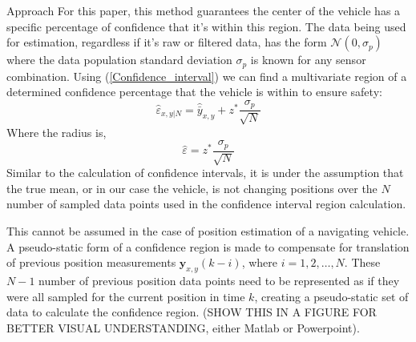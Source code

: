 \begin{section}{Approach}
For this paper, this method guarantees the center of the vehicle has a specific percentage of confidence that it's within this region. The data being used for estimation, regardless if it's raw or filtered data, has the form $\mathcal{N}(0,\sigma_p)$ where the data population standard deviation $\sigma_p$ is known for any sensor combination. Using (\ref{Confidence_interval}) we can find a multivariate region of a determined confidence percentage that the vehicle is within to ensure safety:
    \begin{equation}
    \label{Confidence_region}
		\hat{\varepsilon}_{x,y|N} = \hat{\bar{y}}_{x,y} + z^{*}\frac{\sigma_p}{\sqrt{N}}
	\end{equation}
Where the radius is,
    \begin{equation}
		\hat{\varepsilon} = z^{*}\frac{\sigma_p}{\sqrt{N}}
	\end{equation}
Similar to the calculation of confidence intervals, it is under the assumption that the true mean, or in our case the vehicle, is not changing positions over the $N$ number of sampled data points used in the confidence interval region calculation.

 This cannot be assumed in the case of position estimation of a navigating vehicle. A pseudo-static form of a confidence region is made to compensate for translation of previous position measurements $\bm{y}_{x,y}(k-i)$, where $i=1,2,\dots,N$. These $N-1$ number of previous position data points need to be represented as if they were all sampled for the current position in time $k$, creating a pseudo-static set of data to calculate the confidence region. (SHOW THIS IN A FIGURE FOR BETTER VISUAL UNDERSTANDING, either Matlab or Powerpoint).


\end{section}
